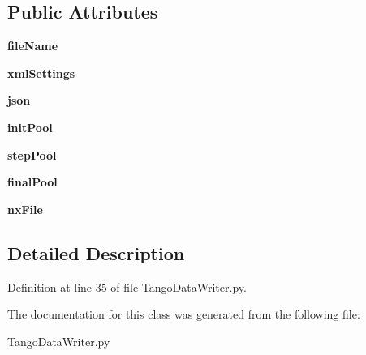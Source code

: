 \subsection*{Public Attributes}
\begin{DoxyCompactItemize}
\item 
\hypertarget{classTangoDataWriter_1_1TangoDataWriter_af8b83ab8948abacd2a7f8e81130d628d}{
{\bfseries fileName}}
\label{classTangoDataWriter_1_1TangoDataWriter_af8b83ab8948abacd2a7f8e81130d628d}

\item 
\hypertarget{classTangoDataWriter_1_1TangoDataWriter_a348deefc4a63a868656d748d462ac119}{
{\bfseries xmlSettings}}
\label{classTangoDataWriter_1_1TangoDataWriter_a348deefc4a63a868656d748d462ac119}

\item 
\hypertarget{classTangoDataWriter_1_1TangoDataWriter_a9620f50d92f70ac347b084ff6d5a7179}{
{\bfseries json}}
\label{classTangoDataWriter_1_1TangoDataWriter_a9620f50d92f70ac347b084ff6d5a7179}

\item 
\hypertarget{classTangoDataWriter_1_1TangoDataWriter_a3637b94184ffb11fe66c2f5ce808e0be}{
{\bfseries initPool}}
\label{classTangoDataWriter_1_1TangoDataWriter_a3637b94184ffb11fe66c2f5ce808e0be}

\item 
\hypertarget{classTangoDataWriter_1_1TangoDataWriter_a057e3e25b8464f4b9f1b770f4a530642}{
{\bfseries stepPool}}
\label{classTangoDataWriter_1_1TangoDataWriter_a057e3e25b8464f4b9f1b770f4a530642}

\item 
\hypertarget{classTangoDataWriter_1_1TangoDataWriter_a243bf34190ea256fa76f3091a564cc39}{
{\bfseries finalPool}}
\label{classTangoDataWriter_1_1TangoDataWriter_a243bf34190ea256fa76f3091a564cc39}

\item 
\hypertarget{classTangoDataWriter_1_1TangoDataWriter_ac9cd68cb06f20e242cdf234542c6db7b}{
{\bfseries nxFile}}
\label{classTangoDataWriter_1_1TangoDataWriter_ac9cd68cb06f20e242cdf234542c6db7b}

\end{DoxyCompactItemize}


\subsection{Detailed Description}


Definition at line 35 of file TangoDataWriter.py.

The documentation for this class was generated from the following file:\begin{DoxyCompactItemize}
\item 
TangoDataWriter.py\end{DoxyCompactItemize}
